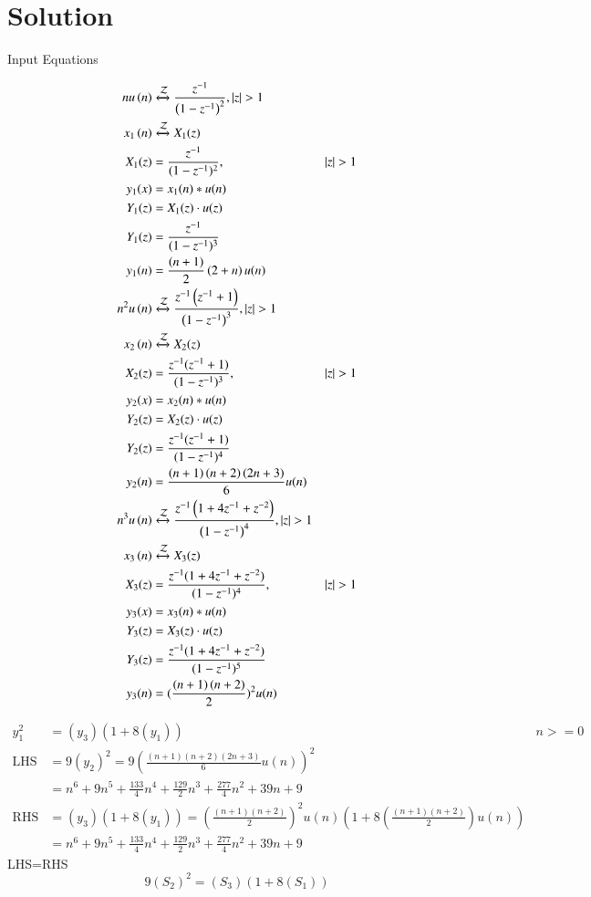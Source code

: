 \documentclass[journal,12pt,onecolumn]{IEEEtran}
\theoremstyle{remark}
\begin{document}
\section*{Solution}
\begin{table}[h]
  \centering
  
  \caption{Input Equations}
  \label{tab:input-equations}
\end{table}
\begin{align}
    n u\left(n\right) &\xleftrightarrow{\mathcal{Z}} \frac{z^{-1}}{\left(1-z^{-1}\right)^2} ,   \left\vert z\right\vert >1 \\
    x_1\left(n\right) &\xleftrightarrow{\mathcal{Z}}X_1(z)\\
    X_1(z) &= \frac{z^{-1}}{(1-z^{-1})^2}, &|z| > 1 \\
    y_1(x) &= x_1(n)* u(n)\\
    Y_1(z) &= X_1(z) \cdot u(z) \\
    Y_1(z) &= \frac{z^{-1}}{(1-z^{-1})^3} \\
    y_1(n) &= \frac{\left( n+1 \right)}{2}\left( 2+n \right)u(n)\\
    n^2 u\left(n\right) &\xleftrightarrow{\mathcal{Z}} \frac{z^{-1}\left(z^{-1}+1\right)}{\left(1-z^{-1}\right)^3} ,  \left\vert z\right\vert > 1\\
    x_2\left(n\right) &\xleftrightarrow{\mathcal{Z}}X_2(z)\\
    X_2(z) &= \frac{z^{-1}(z^{-1}+1)}{(1-z^{-1})^3}, &|z| > 1 \\
    y_2(x) &= x_2(n)* u(n)\\
    Y_2(z) &= X_2(z) \cdot u(z) \\
    Y_2(z) &= \frac{z^{-1}(z^{-1}+1)}{(1-z^{-1})^4} \\ 
    y_2(n) &= \frac{\left( n+1 \right)\left( n+2 \right)\left( 2n+3 \right)}{6}u(n) \\
    n^3 u\left(n\right) &\xleftrightarrow{\mathcal{Z}} \frac{z^{-1}\left(1+4z^{-1}+z^{-2}\right)}{\left(1-z^{-1}\right)^4} ,   \left\vert z\right\vert >1 \\ 
    x_3\left(n\right) &\xleftrightarrow{\mathcal{Z}}X_3(z)\\
    X_3(z) &= \frac{z^{-1}(1+4z^{-1}+z^{-2})}{(1-z^{-1})^4}, &|z| > 1 \\
    y_3(x) &= x_3(n)* u(n)\\
    Y_3(z) &= X_3(z) \cdot u(z) \\
    Y_3(z) &= \frac{z^{-1}(1+4z^{-1}+z^{-2})}{(1-z^{-1})^5}\\
    y_3(n) &= (\frac{\left( n+1 \right)\left( n+2 \right)}{2})^2u(n)
\end{align} 

\begin{align}
y_1^2 &= (y_3)(1 + 8(y_1)) &n>=0\\
\text{LHS} &= 9(y_2)^2 = 9\left(\frac{(n+1)(n+2)(2n+3)}{6}u(n)\right)^2\\
&= n^6 + 9n^5 + \frac{133}{4}n^4 + \frac{129}{2}n^3 + \frac{277}{4}n^2 + 39n + 9\\
\text{RHS} &= (y_3)(1 + 8(y_1)) = \left(\frac{(n+1)(n+2)}{2}\right)^2u(n)(1+8\left(\frac{(n+1)(n+2)}{2}\right)u(n)) \\
&= n^6 + 9n^5 + \frac{133}{4}n^4 + \frac{129}{2}n^3 + \frac{277}{4}n^2 + 39n + 9
\end{align}
LHS=RHS
\[ 9(S_2)^2 = (S_3)(1 + 8(S_1)) \]
    
\end{document}
